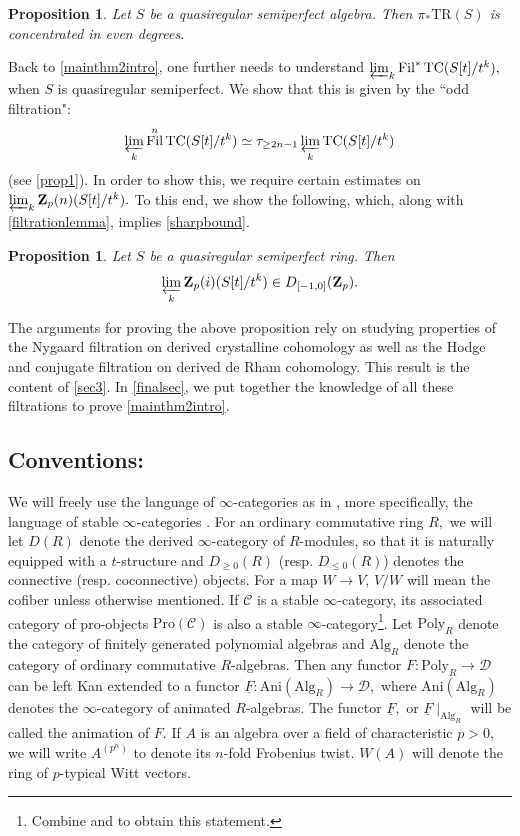 \documentclass[10pt,letterpaper]{amsart}
\numberwithin{figure}{section}
\numberwithin{equation}{section}
\newtheorem{proposition}[figure]{Proposition}
\theoremstyle{definition}
\theoremstyle{definition}
\theoremstyle{definition}
\theoremstyle{definition}
\DeclareMathOperator{\Fil}{Fil}
\newcommand{\TR}{\mathrm{TR}}
\newcommand{\TC}{\mathrm{TC}}
\newcommand{\Z}{\mathbf{Z}}
\begin{document}
\begin{proposition}
    Let $S$ be a quasiregular semiperfect algebra. Then $\pi_* \TR(S)$ is concentrated in even degrees.
\end{proposition}{}
Back to \cref{mainthm2intro}, one further needs to understand $\varprojlim_{k} \Fil^* \TC (S[t]/t^k),$ when $S$ is quasiregular semiperfect. We show that this is given by the ``odd filtration": 
\begin{equation}\label{sharpbound}
     \varprojlim_k \Fil^n \TC (S[t]/t^k) \simeq \tau_{\ge 2n-1}  \varprojlim_k \TC (S[t]/t^k)
\end{equation}(see \cref{prop1}). In order to show this, we require certain estimates on $\varprojlim _k \Z_p(n)(S[t]/t^k).$ To this end, we show the following, which, along with \cref{filtrationlemma}, implies \cref{sharpbound}.

\begin{proposition}
Let $S$ be a quasiregular semiperfect ring. Then $$ \varprojlim_k \Z_p(i)(S[t]/t^k) \in D_{[-1,0]} (\Z_p).$$    
\end{proposition}{}

The arguments for proving the above proposition rely on studying properties of the Nygaard filtration on derived crystalline cohomology as well as the Hodge and conjugate filtration on derived de Rham cohomology. This result is the content of \cref{sec3}. In \cref{finalsec}, we put together the knowledge of all these filtrations to prove \cref{mainthm2intro}.

\subsection*{Conventions:} We will freely use the language of $\infty$-categories as in \cite{Lur09}, more specifically, the language of stable $\infty$-categories \cite{luriehigher}. For an ordinary commutative ring $R,$ we will let $D(R)$ denote the derived $\infty$-category of $R$-modules, so that it is naturally equipped with a $t$-structure and $D_{\ge 0}(R)$ (resp. $D_{\le 0} (R)$) denotes the connective (resp. coconnective) objects. For a map $W \to V$, $V/W$ will mean the cofiber unless otherwise mentioned. If $\mathcal C$ is a stable $\infty$-category, its associated category of pro-objects $\mathrm{Pro}(\mathcal{C})$ is also a stable $\infty$-category\footnote{Combine \cite[Rmk.~2.13]{LurX} and \cite[Thm.~4.5]{LurX} to obtain this statement.}. Let $\mathrm{Poly}_R$ denote the category of finitely generated polynomial algebras and $\mathrm{Alg}_R$ denote the category of ordinary commutative $R$-algebras. Then any functor $F: \mathrm{Poly}_R \to \mathcal{D}$ can be left Kan extended to a functor $\underline{F}: \mathrm{Ani}(\mathrm{Alg}_R) \to \mathcal{D},$ where $\mathrm{Ani}(\mathrm{Alg}_R)$ denotes the $\infty$-category of animated $R$-algebras. The functor $\underline{F},$ or $\underline{F} \mid_{\mathrm{Alg}_R}$ will be called the animation of $F.$ If $A$ is an algebra over a field of characteristic $p>0$, we will write $A^{(p^n)}$ to denote its $n$-fold Frobenius twist. $W(A)$ will denote the ring of $p$-typical Witt vectors.
\end{document}

